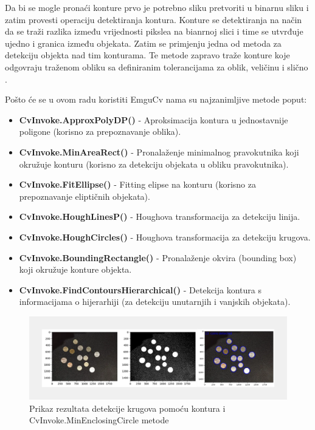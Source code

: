 \documentclass{foi}
\begin{document}
Da bi se mogle pronaći konture prvo je potrebno sliku pretvoriti u binarnu sliku i zatim provesti operaciju detektiranja kontura. Konture se detektiranja na način da se traži razlika između vrijednosti pikslea na bianrnoj slici i time se utvrđuje ujedno i granica između objekata. Zatim se primjenju jedna od metoda za detekciju objekta nad tim konturama. Te metode zapravo traže konture koje odgovraju traženom obliku sa definiranim tolerancijama za oblik, veličinu i slično \cite{konturesShapes}.

\begin{flushleft}
    Pošto će se u ovom radu koristiti EmguCv nama su najzanimljive metode poput:
    \begin{itemize}
        \item \textbf{CvInvoke.ApproxPolyDP()} - Aproksimacija kontura u jednostavnije poligone (korisno za prepoznavanje oblika).
        \item \textbf{CvInvoke.MinAreaRect()} - Pronalaženje minimalnog pravokutnika koji okružuje konturu (korisno za detekciju objekata u obliku pravokutnika).
        \item \textbf{CvInvoke.FitEllipse()} - Fitting elipse na konturu (korisno za prepoznavanje eliptičnih objekata).
        \item \textbf{CvInvoke.HoughLinesP()} - Houghova transformacija za detekciju linija.
        \item \textbf{CvInvoke.HoughCircles()} - Houghova transformacija za detekciju krugova.
        \item \textbf{CvInvoke.BoundingRectangle()} - Pronalaženje okvira (bounding box) koji okružuje konture objekta.
        \item \textbf{CvInvoke.FindContoursHierarchical()} - Detekcija kontura s informacijama o hijerarhiji (za detekciju unutarnjih i vanjskih objekata).
    \end{itemize}
    \end{flushleft}

\begin{figure}[H]
    \centering
    \includegraphics[width=1.0\linewidth]{slike/shapeDetection.png}
    \caption{\centering Prikaz rezultata detekcije krugova pomoću kontura i CvInvoke.MinEnclosingCircle metode \cite{segvsdetection_2}}
\end{figure}
\end{document}
